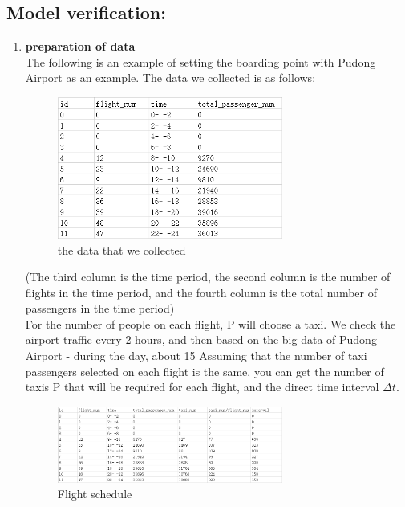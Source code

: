 \subsection{Model verification:}
\begin{enumerate}
    \item \textbf{preparation of data}\\
    The following is an example of setting the boarding point with Pudong Airport as an example.
The data we collected is as follows:



\begin{figure}[H]
\centering
\includegraphics[width=0.7\textwidth]{figures/Data_31.png}
\caption{the data that we collected}
\label{fig:label}
\end{figure}
(The third column is the time period, the second column is the number of flights in the time period, and the fourth column is the total number of passengers in the time period)\\
For the number of people on each flight, P will choose a taxi. We check the airport traffic every 2 hours, and then based on the big data of Pudong Airport - during the day, about 15%
Assuming that the number of taxi passengers selected on each flight is the same, you can get the number of taxis P that will be required for each flight, and the direct time interval $\Delta t$.

\begin{figure}[H]
\centering
\includegraphics[width=0.7\textwidth]{figures/data3_2.png}
\caption{Flight schedule}
\label{fig:label}
\end{figure}


\end{enumerate}
